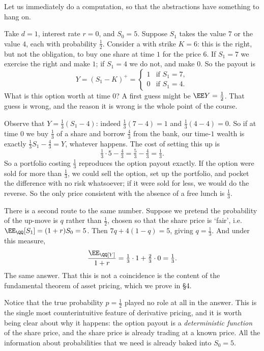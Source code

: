 Let us immediately do a computation, so that the abstractions have something to hang on.

\begin{example}
	Take $d = 1$, interest rate $r = 0$, and $S_0 = 5$. Suppose $S_1$ takes the value $7$ or the value $4$, each with probability $\tfrac12$. Consider a  with strike $K = 6$: this is the right, but not the obligation, to buy one share at time $1$ for the price $6$. If $S_1 = 7$ we exercise the right and make $1$; if $S_1 = 4$ we do not, and make $0$. So the payout is
	$$
	Y = (S_1 - K)^+ = \begin{cases} 1 & \text{if } S_1 = 7,\\ 0 & \text{if } S_1 = 4.\end{cases}
	$$
	What is this option worth at time $0$? A first guess might be $\EE Y = \tfrac12$. That guess is wrong, and the reason it is wrong is the whole point of the course.

	Observe that $Y = \tfrac13(S_1 - 4)$: indeed $\tfrac13(7-4) = 1$ and $\tfrac13(4-4) = 0$. So if at time $0$ we buy $\tfrac13$ of a share and borrow $\tfrac43$ from the bank, our time-$1$ wealth is exactly $\tfrac13 S_1 - \tfrac43 = Y$, whatever happens. The cost of setting this up is
	$$
	\tfrac13 \cdot 5 - \tfrac43 = \tfrac53 - \tfrac43 = \tfrac13.
	$$
	So a portfolio costing $\tfrac13$ reproduces the option payout exactly. If the option were sold for more than $\tfrac13$, we could sell the option, set up the portfolio, and pocket the difference with no risk whatsoever; if it were sold for less, we would do the reverse. So the only price consistent with the absence of a free lunch is $\tfrac13$.

	There is a second route to the same number. Suppose we pretend the probability of the up-move is $q$ rather than $\tfrac12$, chosen so that the share price is `fair', i.e.\ $\EE_{\QQ}[S_1] = (1+r)S_0 = 5$. Then $7q + 4(1-q) = 5$, giving $q = \tfrac13$. And under this measure,
	$$
	\frac{\EE_\QQ[Y]}{1+r} = \tfrac13 \cdot 1 + \tfrac23 \cdot 0 = \tfrac13.
	$$
	The same answer. That this is not a coincidence is the content of the fundamental theorem of asset pricing, which we prove in \S4.
\end{example}

Notice that the true probability $p = \tfrac12$ played no role at all in the answer. This is the single most counterintuitive feature of derivative pricing, and it is worth being clear about why it happens: the option payout is a \emph{deterministic function} of the share price, and the share price is already trading at a known price. All the information about probabilities that we need is already baked into $S_0 = 5$.


